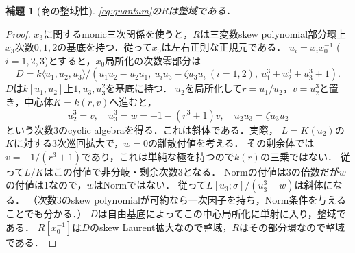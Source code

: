 \documentclass[11pt,a4paper]{ltjsarticle}
\newtheorem{lemma}[theorem]{補題}
\theoremstyle{definition}\newtheorem{definition}[theorem]{定義}
\begin{document}
\begin{lemma}[商の整域性]\label{lem:domain}
\eqref{eq:quantum}の$R$は整域である．
\end{lemma}
\begin{proof}
$x_3$に関するmonic三次関係を使うと，$R$は三変数skew polynomial部分環上
$x_3$次数$0,1,2$の基底を持つ．従って$x_0$は左右正則な正規元である．
$u_i=x_i x_0^{-1}$ ($i=1,2,3$)とすると，$x_0$局所化の次数零部分は
\[
 D=k\langle u_1,u_2,u_3\rangle/
 (u_1u_2-u_2u_1,\ u_iu_3-\zeta u_3u_i\ (i=1,2),\
 u_1^3+u_2^3+u_3^3+1).
\]
$D$は$k[u_1,u_2]$上$1,u_3,u_3^2$を基底に持つ．
$u_2$を局所化して$r=u_1/u_2$，$v=u_2^3$と置き，中心体$K=k(r,v)$へ進むと，
\[
 u_2^3=v,\quad u_3^3=w=-1-(r^3+1)v,\quad u_2u_3=\zeta u_3u_2
\]
という次数3のcyclic algebraを得る．これは斜体である．実際，
$L=K(u_2)$の$K$に対する3次巡回拡大で，$w=0$の離散付値を考える．
その剰余体では$v=-1/(r^3+1)$であり，これは単純な極を持つので$k(r)$の三乗ではない．
従って$L/K$はこの付値で非分岐・剰余次数3となる．
Normの付値は3の倍数だが$w$の付値は1なので，$w$はNormではない．
従って$L[u_3;\sigma]/(u_3^3-w)$は斜体になる．
（次数3のskew polynomialが可約なら一次因子を持ち，Norm条件を与えることでも分かる．）
$D$は自由基底によってこの中心局所化に単射に入り，整域である．
$R[x_0^{-1}]$は$D$のskew Laurent拡大なので整域，$R$はその部分環なので整域である．
\end{proof}
\end{document}
